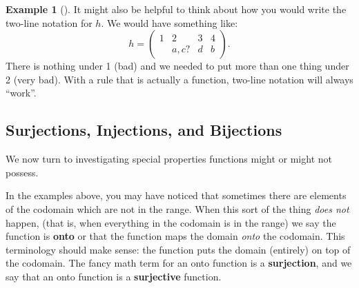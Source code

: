 \documentclass[10pt,]{book}
\newcommand{\terminology}[1]{\textbf{#1}}
\theoremstyle{plain}
\theoremstyle{definition}
\newtheorem{example}[theorem]{Example}
\theoremstyle{definition}
\theoremstyle{definition}
\numberwithin{equation}{section}
\newcommand{\amp}{ & }
\begin{document}
\begin{example}[]
          It might also be helpful to think about how you would write the two-line notation for \(h\). We would have something like:
          \begin{equation*}
            h=\begin{pmatrix} 1 \amp 2 \amp 3 \amp 4 \\ \amp a,c? \amp d \amp b\end{pmatrix}.
          \end{equation*}
          There is nothing under 1 (bad) and we needed to put more than one thing under 2 (very bad). With a rule that is actually a function, two-line notation will always ``work''.
\end{example}
\typeout{************************************************}
\typeout{************************************************}
\subsection[Surjections, Injections, and Bijections]{Surjections, Injections, and Bijections}\label{subsec_surj-inj-bij}

      We now turn to investigating special properties functions might or might not possess.
\par

      In the examples above, you may have noticed that sometimes there are elements of the codomain which are not in the range. When this sort of the thing \emph{does not} happen, (that is, when everything in the codomain is in the range) we say the function is
      \terminology{onto} or that the function maps the domain \emph{onto} the codomain. This terminology should make sense: the function puts the domain (entirely) on top of the codomain. The fancy math term for an onto function is a
      \terminology{surjection}, and we say that an onto function is a
      \terminology{surjective} function.
\par
\end{document}
